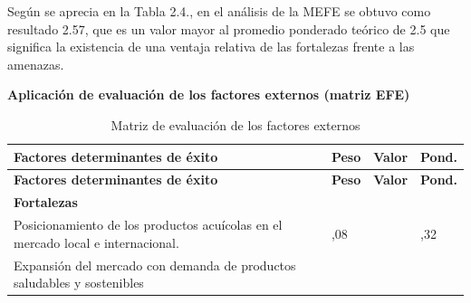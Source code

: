 \documentclass[
  stu,
  floatsintext,
  longtable,
  a4paper,
  nolmodern,
  notxfonts,
  notimes,
  12pt,
  colorlinks=true,linkcolor=blue,citecolor=blue,urlcolor=blue]{apa7}
\begin{document}
Según se aprecia en la Tabla 2.4., en el análisis de la MEFE se obtuvo
como resultado 2.57, que es un valor mayor al promedio ponderado teórico
de 2.5 que significa la existencia de una ventaja relativa de las
fortalezas frente a las amenazas.

\textbf{Aplicación de evaluación de los factores externos (matriz EFE)}

\begin{longtable}[]{@{}
  >{\raggedright\arraybackslash}p{}
  >{\centering\arraybackslash}p{}
  >{\centering\arraybackslash}p{}
  >{\centering\arraybackslash}p{}@{}}
\caption{Matriz de evaluación de los factores externos}\tabularnewline
\toprule\noalign{}
\begin{minipage}[b]{\linewidth}\raggedright
\textbf{Factores determinantes de éxito}
\end{minipage} & \begin{minipage}[b]{\linewidth}\centering
\textbf{Peso}
\end{minipage} & \begin{minipage}[b]{\linewidth}\centering
\textbf{Valor}
\end{minipage} & \begin{minipage}[b]{\linewidth}\centering
\textbf{Pond.}
\end{minipage} \\
\midrule\noalign{}
\endfirsthead
\toprule\noalign{}
\begin{minipage}[b]{\linewidth}\raggedright
\textbf{Factores determinantes de éxito}
\end{minipage} & \begin{minipage}[b]{\linewidth}\centering
\textbf{Peso}
\end{minipage} & \begin{minipage}[b]{\linewidth}\centering
\textbf{Valor}
\end{minipage} & \begin{minipage}[b]{\linewidth}\centering
\textbf{Pond.}
\end{minipage} \\
\midrule\noalign{}
\endhead
\bottomrule\noalign{}
\endlastfoot
\textbf{Fortalezas} & & & \\
Posicionamiento de los productos acuícolas en el mercado local e
internacional. & 0,08 & 4 & 0,32 \\
Expansión del mercado con demanda de productos saludables y sostenibles

\end{longtable}
\end{document}
